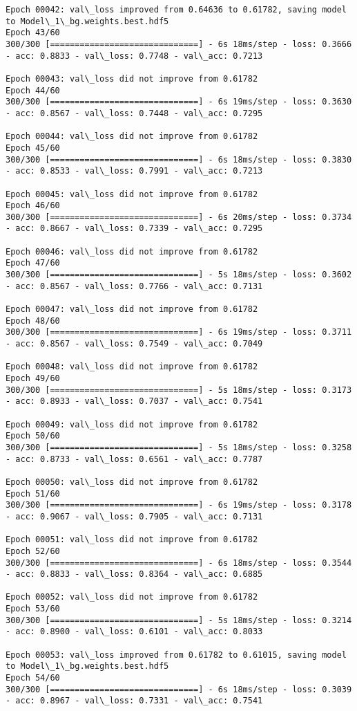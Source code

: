 \documentclass[11pt]{article}
\begin{document}
\begin{Verbatim}[commandchars=\\\{\}]
Epoch 00042: val\_loss improved from 0.64636 to 0.61782, saving model to Model\_1\_bg.weights.best.hdf5
Epoch 43/60
300/300 [==============================] - 6s 18ms/step - loss: 0.3666 - acc: 0.8833 - val\_loss: 0.7748 - val\_acc: 0.7213

Epoch 00043: val\_loss did not improve from 0.61782
Epoch 44/60
300/300 [==============================] - 6s 19ms/step - loss: 0.3630 - acc: 0.8567 - val\_loss: 0.7448 - val\_acc: 0.7295

Epoch 00044: val\_loss did not improve from 0.61782
Epoch 45/60
300/300 [==============================] - 6s 18ms/step - loss: 0.3830 - acc: 0.8533 - val\_loss: 0.7991 - val\_acc: 0.7213

Epoch 00045: val\_loss did not improve from 0.61782
Epoch 46/60
300/300 [==============================] - 6s 20ms/step - loss: 0.3734 - acc: 0.8667 - val\_loss: 0.7339 - val\_acc: 0.7295

Epoch 00046: val\_loss did not improve from 0.61782
Epoch 47/60
300/300 [==============================] - 5s 18ms/step - loss: 0.3602 - acc: 0.8567 - val\_loss: 0.7766 - val\_acc: 0.7131

Epoch 00047: val\_loss did not improve from 0.61782
Epoch 48/60
300/300 [==============================] - 6s 19ms/step - loss: 0.3711 - acc: 0.8567 - val\_loss: 0.7549 - val\_acc: 0.7049

Epoch 00048: val\_loss did not improve from 0.61782
Epoch 49/60
300/300 [==============================] - 5s 18ms/step - loss: 0.3173 - acc: 0.8933 - val\_loss: 0.7037 - val\_acc: 0.7541

Epoch 00049: val\_loss did not improve from 0.61782
Epoch 50/60
300/300 [==============================] - 5s 18ms/step - loss: 0.3258 - acc: 0.8733 - val\_loss: 0.6561 - val\_acc: 0.7787

Epoch 00050: val\_loss did not improve from 0.61782
Epoch 51/60
300/300 [==============================] - 6s 19ms/step - loss: 0.3178 - acc: 0.9067 - val\_loss: 0.7905 - val\_acc: 0.7131

Epoch 00051: val\_loss did not improve from 0.61782
Epoch 52/60
300/300 [==============================] - 6s 18ms/step - loss: 0.3544 - acc: 0.8833 - val\_loss: 0.8364 - val\_acc: 0.6885

Epoch 00052: val\_loss did not improve from 0.61782
Epoch 53/60
300/300 [==============================] - 5s 18ms/step - loss: 0.3214 - acc: 0.8900 - val\_loss: 0.6101 - val\_acc: 0.8033

Epoch 00053: val\_loss improved from 0.61782 to 0.61015, saving model to Model\_1\_bg.weights.best.hdf5
Epoch 54/60
300/300 [==============================] - 6s 18ms/step - loss: 0.3039 - acc: 0.8967 - val\_loss: 0.7331 - val\_acc: 0.7541


\end{Verbatim}
\end{document}
